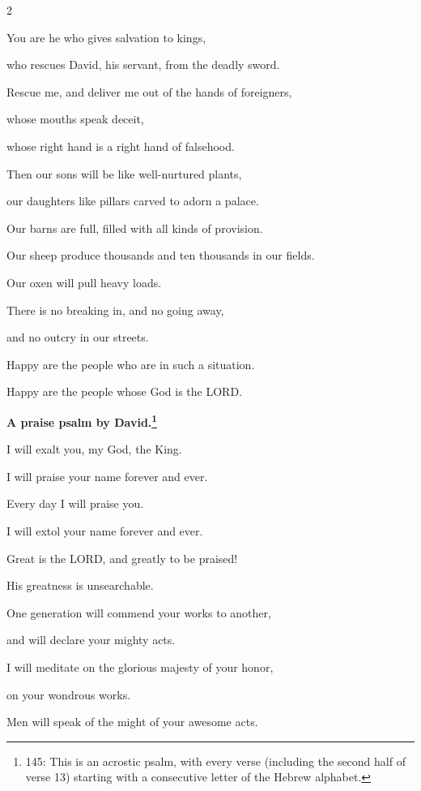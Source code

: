 \begin{multicols}{2}
	
	\myverse{}You are he who gives salvation to kings,
	
	who rescues David, his servant, from the deadly sword.
	
	
	\myverse{}Rescue me, and deliver me out of the hands of foreigners,
	
	whose mouths speak deceit,
	
	whose right hand is a right hand of falsehood.
	
	\vspace{\baselineskip}
	
	\myverse{}Then our sons will be like well-nurtured plants,
	
	our daughters like pillars carved to adorn a palace.
	
	
	\myverse{}Our barns are full, filled with all kinds of provision.
	
	Our sheep produce thousands and ten thousands in our fields.
	
	
	\myverse{}Our oxen will pull heavy loads.
	
	There is no breaking in, and no going away,
	
	and no outcry in our streets.
	
	
	\myverse{}Happy are the people who are in such a situation.
	
	Happy are the people whose God is the LORD.
	
	
	\mychapter{}\textbf{A praise psalm by David.\footnote{145: This is an acrostic psalm, with every verse (including the second half of verse 13) starting with a consecutive letter of the Hebrew alphabet.}}
	
	\quad\quad\quad \myverse*{}I will exalt you, my God, the King.
	
	I will praise your name forever and ever.
	
	
	\myverse{}Every day I will praise you.
	
	I will extol your name forever and ever.
	
	
	\myverse{}Great is the LORD, and greatly to be praised!
	
	His greatness is unsearchable.
	
	
	\myverse{}One generation will commend your works to another,
	
	and will declare your mighty acts.
	
	
	\myverse{}I will meditate on the glorious majesty of your honor,
	
	on your wondrous works.
	
	
	\myverse{}Men will speak of the might of your awesome acts.
	

\end{multicols}
